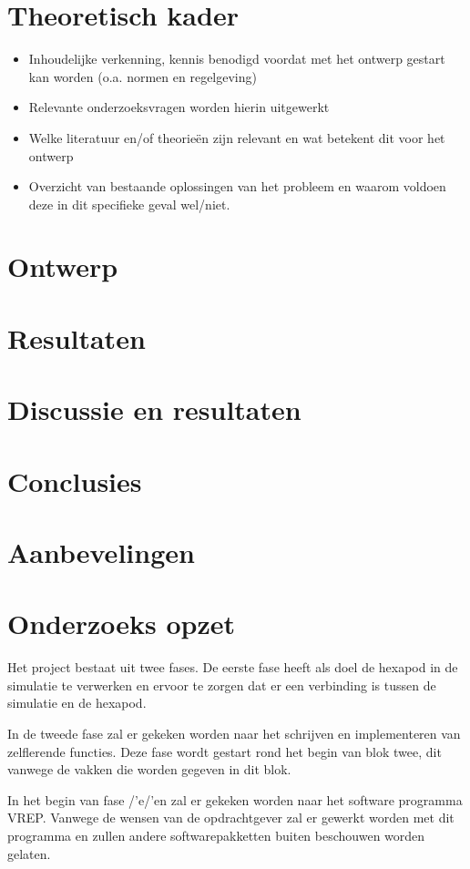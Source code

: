 \documentclass[10pt,a4paper]{article}
\begin{document}
\section{Theoretisch kader}
\begin{itemize}
\setlength\itemsep{0em}
\item Inhoudelijke verkenning, kennis benodigd voordat met het ontwerp gestart kan worden (o.a. normen en regelgeving)
\item Relevante onderzoeksvragen worden hierin uitgewerkt 
\item Welke literatuur en/of theorieën zijn relevant en wat betekent dit voor het ontwerp \item Overzicht van bestaande oplossingen van het probleem en waarom voldoen deze in dit specifieke geval wel/niet.
\end{itemize}
\newpage

\section{Ontwerp}
\newpage

\section{Resultaten}
\section{Discussie en resultaten}
\section{Conclusies}
\section{Aanbevelingen}

\section{Onderzoeks opzet}
Het project bestaat uit twee fases. De eerste fase heeft als doel de hexapod in de simulatie te verwerken en ervoor te zorgen dat er een verbinding is tussen de simulatie en de hexapod. 

In de tweede fase zal er gekeken worden naar het schrijven en implementeren van zelflerende functies. Deze fase wordt gestart rond het begin van blok twee, dit vanwege de vakken die worden gegeven in dit blok.

In het begin van fase /'e/'en zal er gekeken worden naar het software programma VREP. Vanwege de wensen van de opdrachtgever zal er gewerkt worden met dit programma en zullen andere softwarepakketten buiten beschouwen worden gelaten.  
\end{document}
